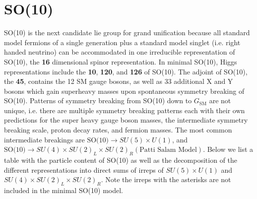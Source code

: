 \documentclass[aps,onecolumn,twoside,secnumarabic,balancelastpage,amsmath,amssymb,nofootinbib,hyperref=pdftex]{revtex4}
\begin{document}
\section{SO(10)}
SO(10) is the next candidate lie group for grand unification because all standard model fermions of a single generation plus a standard model singlet (i.e. right handed neutrino) can be accommodated in one irreducible representation of SO(10), the \textbf{16} dimensional spinor representation. In minimal SO(10), Higgs representations include the \textbf{10}, \textbf{120}, and \textbf{126} of SO(10). The adjoint of SO(10), the \textbf{45}, contains the 12 SM gauge bosons, as well as 33 additional X and Y bosons which gain superheavy masses upon spontaneous symmetry breaking of SO(10).
\vskip 0.2in
 Patterns of symmetry breaking from SO(10) down to $G_{\text{SM}}$ are not unique, i.e. there are multiple symmetry breaking patterns each with their own predictions for the super heavy gauge boson masses, the intermediate symmetry breaking scale, proton decay rates, and fermion masses. The most common intermediate breakings are $\text{SO(10)} \rightarrow SU(5)\times U(1)$, and $\text{SO(10)} \rightarrow SU(4)\times SU(2)_{L}\times SU(2)_{R} (\text{Patti Salam Model})$.
Below we list a table with the particle content of SO(10) as well as the decomposition of the different representations into direct sums of irreps of $SU(5)\times U(1)$ and $SU(4)\times SU(2)_{L}\times SU(2)_{R}$. Note the irreps with the asterisks are not included in the minimal SO(10) model. 
\end{document}
